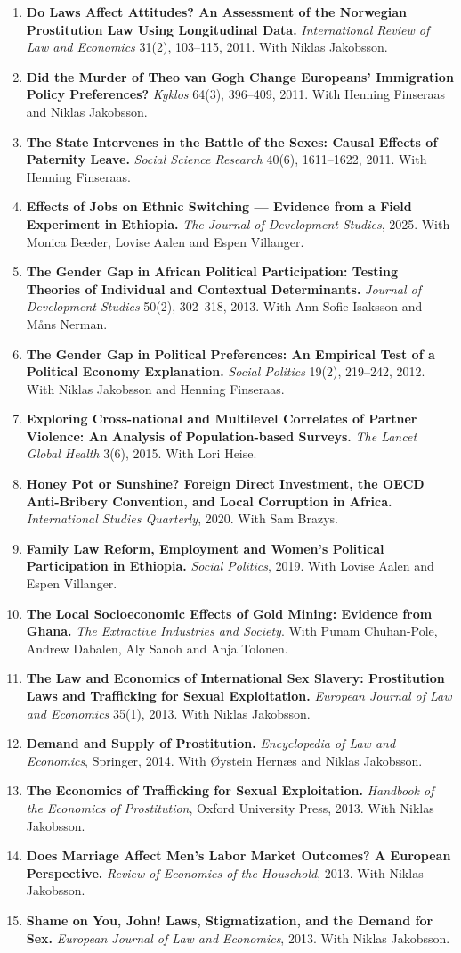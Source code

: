 \documentclass[11pt]{article}
\newcommand{\pub}[2]{\item \textbf{#1} #2}
\begin{document}
\begin{enumerate}
\pub{Do Laws Affect Attitudes? An Assessment of the Norwegian Prostitution Law Using Longitudinal Data.}{\textit{International Review of Law and Economics} 31(2), 103--115, 2011. With Niklas Jakobsson.}
\pub{Did the Murder of Theo van Gogh Change Europeans' Immigration Policy Preferences?}{\textit{Kyklos} 64(3), 396--409, 2011. With Henning Finseraas and Niklas Jakobsson.}
\pub{The State Intervenes in the Battle of the Sexes: Causal Effects of Paternity Leave.}{\textit{Social Science Research} 40(6), 1611--1622, 2011. With Henning Finseraas.}
\pub{Effects of Jobs on Ethnic Switching --- Evidence from a Field Experiment in Ethiopia.}{\textit{The Journal of Development Studies}, 2025. With Monica Beeder, Lovise Aalen and Espen Villanger.}
\pub{The Gender Gap in African Political Participation: Testing Theories of Individual and Contextual Determinants.}{\textit{Journal of Development Studies} 50(2), 302--318, 2013. With Ann-Sofie Isaksson and Måns Nerman.}
\pub{The Gender Gap in Political Preferences: An Empirical Test of a Political Economy Explanation.}{\textit{Social Politics} 19(2), 219--242, 2012. With Niklas Jakobsson and Henning Finseraas.}
\pub{Exploring Cross-national and Multilevel Correlates of Partner Violence: An Analysis of Population-based Surveys.}{\textit{The Lancet Global Health} 3(6), 2015. With Lori Heise.}
\pub{Honey Pot or Sunshine? Foreign Direct Investment, the OECD Anti-Bribery Convention, and Local Corruption in Africa.}{\textit{International Studies Quarterly}, 2020. With Sam Brazys.}
\pub{Family Law Reform, Employment and Women's Political Participation in Ethiopia.}{\textit{Social Politics}, 2019. With Lovise Aalen and Espen Villanger.}
\pub{The Local Socioeconomic Effects of Gold Mining: Evidence from Ghana.}{\textit{The Extractive Industries and Society}. With Punam Chuhan-Pole, Andrew Dabalen, Aly Sanoh and Anja Tolonen.}
\pub{The Law and Economics of International Sex Slavery: Prostitution Laws and Trafficking for Sexual Exploitation.}{\textit{European Journal of Law and Economics} 35(1), 2013. With Niklas Jakobsson.}
\pub{Demand and Supply of Prostitution.}{\textit{Encyclopedia of Law and Economics}, Springer, 2014. With Øystein Hernæs and Niklas Jakobsson.}
\pub{The Economics of Trafficking for Sexual Exploitation.}{\textit{Handbook of the Economics of Prostitution}, Oxford University Press, 2013. With Niklas Jakobsson.}
\pub{Does Marriage Affect Men's Labor Market Outcomes? A European Perspective.}{\textit{Review of Economics of the Household}, 2013. With Niklas Jakobsson.}
\pub{Shame on You, John! Laws, Stigmatization, and the Demand for Sex.}{\textit{European Journal of Law and Economics}, 2013. With Niklas Jakobsson.}

\end{enumerate}
\end{document}
